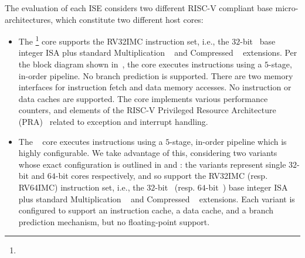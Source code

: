 
The evaluation of each ISE considers two different RISC-V compliant base
micro-architectures, which constitute two different host cores:

\begin{itemize}
\item The \footnote{%
      } core 
      supports the 
      RV32IMC 
      instruction set, i.e.,
      the 
             $32$-bit~\cite[Section 2]{RV:ISA:I:19} 
      base integer ISA plus 
      standard 
      Multiplication ~\cite[Section  7]{RV:ISA:I:19}
      and
      Compressed ~\cite[Section 16]{RV:ISA:I:19}
      extensions.
      Per the block diagram shown in~,
      the core 
      executes instructions using a $5$-stage, in-order pipeline.
      No branch prediction is supported.
      There are two memory interfaces for instruction fetch and data memory
      accesses.
      No instruction or data caches are supported.
      The core implements various performance counters,
      and
      elements of the
      RISC-V Privileged Resource Architecture (PRA)~\cite[Chapter 3]{RV:ISA:II:19}
      related to exception and interrupt handling.

\item The ~\cite{rocket:16} 
        core
      executes instructions using a $5$-stage, in-order pipeline
      which is highly configurable.
      We take advantage of this, considering two variants whose
      exact configuration is outlined in
      and 
      :
      the variants represent single $32$-bit and $64$-bit cores respectively,
      and so
      support  the 
      RV32IMC 
      (resp. RV64IMC)
      instruction set, i.e.,
      the 
             $32$-bit~\cite[Section 2]{RV:ISA:I:19} 
      (resp. $64$-bit~\cite[Section 5]{RV:ISA:I:19})
      base integer ISA plus 
      standard 
      Multiplication ~\cite[Section  7]{RV:ISA:I:19}
      and
      Compressed ~\cite[Section 16]{RV:ISA:I:19}
      extensions.
      Each variant is configured to support
      an instruction cache, 
      a  data        cache,
      and
      a  branch prediction mechanism,
      but 
      no floating-point support.

\end{itemize}

